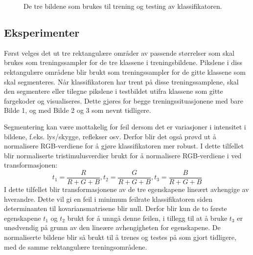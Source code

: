 \documentclass[twocolumn,norwegian]{article}
\begin{document}
	\begin{figure}[ht!]
		\centering
		\caption{De tre bildene som brukes til trening og testing av klassifikatoren. \label{fig:Datasett}
		}
	\end{figure}

	\subsection{Eksperimenter}
	Først velges det ut tre rektangulære områder av passende størrelser som skal brukes som treningssampler for de tre klassene i treningsbildene. Pikslene i diss rektangulære områdene blir brukt som treningssampler for de gitte klassene som skal segmenteres. Når klassifikatoren har trent på disse treningssamplene, skal den segmentere eller tilegne pikslene i testbildet utifra klassene som gitte fargekoder og visualiseres. Dette gjøres for begge treningssituasjonene med bare Bilde 1, og med Bilde 2 og 3 som nevnt tidligere.

	Segmentering kan være mottakelig for feil dersom det er variasjoner i intensitet i bildene, f.eks. lys/skygge, reflekser osv. Derfor blir det også prøvd ut å normalisere RGB-verdiene for å gjøre klassifikatoren mer robust. I dette tilfellet blir normaliserte tristimulusverdier brukt for å normalisere RGB-verdiene i ved transformasjonen:
	\begin{equation*}
		t_1 = \frac{R}{R+G+B}, t_2=\frac{G}{R+G+B}, t_3=\frac{B}{R+G+B}
	\end{equation*}
	I dette tilfellet blir transformasjonene av de tre egenskapene lineært avhengige av hverandre. Dette vil gi en feil i minimum feilrate klassifikatoren siden determinanten til kovariansmatrisene blir null. Derfor blir kun de to første egenskapene $t_1$ og $t_2$ brukt for å unngå denne feilen, i tillegg til at å bruke $t_3$ er unødvendig på grunn av den lineære avhengigheten for egenskapene. De normaliserte bildene blir så brukt til å trenes og testes på som gjort tidligere, med de samme rektangulære treningsområdene.
\end{document}
